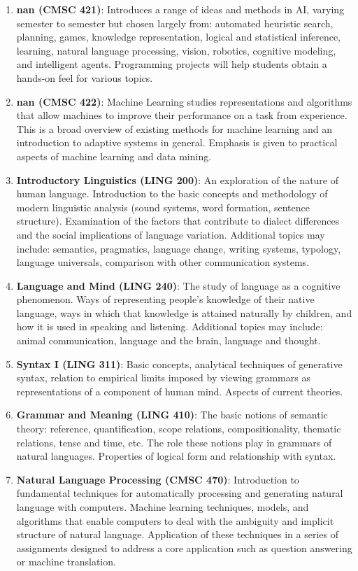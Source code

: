 \begin{enumerate}
\item \textbf{nan (CMSC 421)}: Introduces a range of ideas and methods in AI, varying semester to semester but chosen largely from: automated heuristic search, planning, games, knowledge representation, logical and statistical inference, learning, natural language processing, vision, robotics, cognitive modeling, and intelligent agents. Programming projects will help students obtain a hands-on feel for various topics.
\item \textbf{nan (CMSC 422)}: Machine Learning studies representations and algorithms that allow machines to improve their performance on a task from experience. This is a broad overview of existing methods for machine learning and an introduction to adaptive systems in general. Emphasis is given to practical aspects of machine learning and data mining.
\item \textbf{Introductory Linguistics (LING 200)}: An exploration of the nature of human language. Introduction to the basic concepts and methodology of modern linguistic analysis (sound systems, word formation, sentence structure). Examination of the factors that contribute to dialect differences and the social implications of language variation. Additional topics may include: semantics, pragmatics, language change, writing systems, typology, language universals, comparison with other communication systems.
\item \textbf{Language and Mind (LING 240)}: The study of language as a cognitive phenomenon. Ways of representing people's knowledge of their native language, ways in which that knowledge is attained naturally by children, and how it is used in speaking and listening. Additional topics may include: animal communication, language and the brain, language and thought.
\item \textbf{Syntax I (LING 311)}: Basic concepts, analytical techniques of generative syntax, relation to empirical limits imposed by viewing grammars as representations of a component of human mind. Aspects of current theories.
\item \textbf{Grammar and Meaning (LING 410)}: The basic notions of semantic theory: reference, quantification, scope relations, compositionality, thematic relations, tense and time, etc. The role these notions play in grammars of natural languages. Properties of logical form and relationship with syntax.
\item \textbf{Natural Language Processing (CMSC 470)}: Introduction to fundamental techniques for automatically processing and generating natural language with computers. Machine learning techniques, models, and algorithms that enable computers to deal with the ambiguity and implicit structure of natural language. Application of these techniques in a series of assignments designed to address a core application such as question answering or machine translation.


\end{enumerate}
